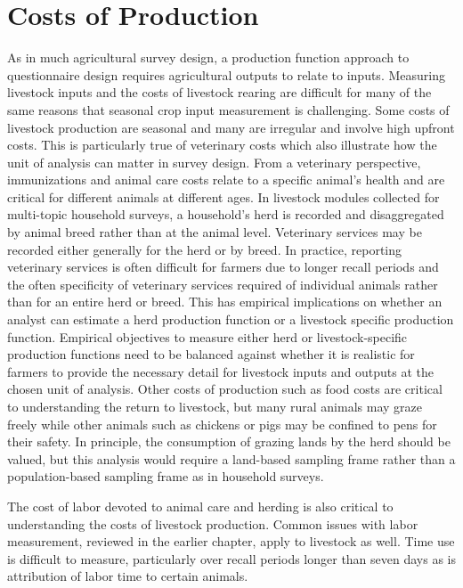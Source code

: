 \documentclass[
]{book}
\begin{document}
\hypertarget{costs-of-production}{%
\section{Costs of Production}\label{costs-of-production}}

As in much agricultural survey design, a production function approach to questionnaire design requires agricultural outputs to relate to inputs. Measuring livestock inputs and the costs of livestock rearing are difficult for many of the same reasons that seasonal crop input measurement is challenging. Some costs of livestock production are seasonal and many are irregular and involve high upfront costs. This is particularly true of veterinary costs which also illustrate how the unit of analysis can matter in survey design. From a veterinary perspective, immunizations and animal care costs relate to a specific animal's health and are critical for different animals at different ages. In livestock modules collected for multi-topic household surveys, a household's herd is recorded and disaggregated by animal breed rather than at the animal level. Veterinary services may be recorded either generally for the herd or by breed. In practice, reporting veterinary services is often difficult for farmers due to longer recall periods and the often specificity of veterinary services required of individual animals rather than for an entire herd or breed. This has empirical implications on whether an analyst can estimate a herd production function or a livestock specific production function. Empirical objectives to measure either herd or livestock-specific production functions need to be balanced against whether it is realistic for farmers to provide the necessary detail for livestock inputs and outputs at the chosen unit of analysis. Other costs of production such as food costs are critical to understanding the return to livestock, but many rural animals may graze freely while other animals such as chickens or pigs may be confined to pens for their safety. In principle, the consumption of grazing lands by the herd should be valued, but this analysis would require a land-based sampling frame rather than a population-based sampling frame as in household surveys.

The cost of labor devoted to animal care and herding is also critical to understanding the costs of livestock production. Common issues with labor measurement, reviewed in the earlier chapter, apply to livestock as well. Time use is difficult to measure, particularly over recall periods longer than seven days as is attribution of labor time to certain animals.
\end{document}
